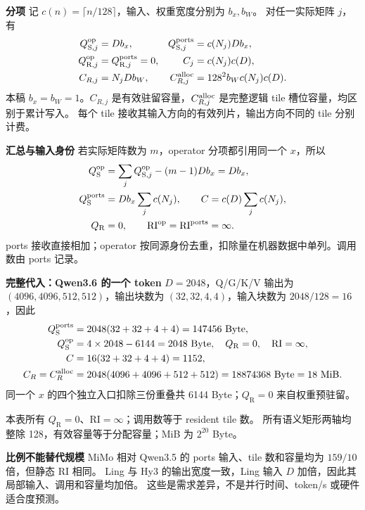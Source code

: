 \documentclass[11pt,a4paper,fontset=fandol]{ctexart}
\newcommand{\qs}{Q_{\mathrm S}}
\newcommand{\qr}{Q_{\mathrm R}}
\newcommand{\RI}{\mathrm{RI}}
\newcommand{\para}[1]{\par\smallskip\noindent\textbf{#1}\quad}
\begin{document}
\para{分项}
记 $c(n)=\lceil n/128\rceil$，输入、权重宽度分别为 $b_x,b_W$。
对任一实际矩阵 $j$，有
\begin{align}
Q_{\mathrm S,j}^{\rm op}&=Db_x,& Q_{\mathrm S,j}^{\rm ports}&=c(N_j)Db_x,\\
Q_{\mathrm R,j}^{\rm op}&=Q_{\mathrm R,j}^{\rm ports}=0,& C_j&=c(N_j)c(D),\\
C_{R,j}&=N_jDb_W,& C_{R,j}^{\rm alloc}&=128^2b_Wc(N_j)c(D).
\end{align}
本稿 $b_x=b_W=1$。$C_{R,j}$ 是有效驻留容量，$C_{R,j}^{\rm alloc}$ 是完整逻辑 tile 槽位容量，均区别于累计写入。
每个 tile 接收其输入方向的有效列片，输出方向不同的 tile 分别计费。

\para{汇总与输入身份}
若实际矩阵数为 $m$，operator 分项都引用同一个 $x$，所以
\begin{align}
\qs^{\rm op}&=\sum_jQ_{\mathrm S,j}^{\rm op}-(m-1)Db_x=Db_x,\\
\qs^{\rm ports}&=Db_x\sum_jc(N_j),\qquad
C=c(D)\sum_jc(N_j),\\
\qr&=0,\qquad \RI^{\rm op}=\RI^{\rm ports}=\infty.
\end{align}
ports 接收直接相加；operator 按同源身份去重，扣除量在机器数据中单列。调用数由 ports 记录。

\para{完整代入：Qwen3.6 的一个 token}
$D=2048$，Q/G/K/V 输出为 $(4096,4096,512,512)$，输出块数为 $(32,32,4,4)$，输入块数为 $2048/128=16$，因此
\begin{align*}
\qs^{\rm ports}&=2048(32+32+4+4)=147456\ \mathrm{Byte},\\
\qs^{\rm op}&=4\times2048-6144=2048\ \mathrm{Byte},\quad \qr=0,\quad \RI=\infty,\\
C&=16(32+32+4+4)=1152,\\
C_R=C_R^{\rm alloc}&=2048(4096+4096+512+512)=18874368\ \mathrm{Byte}=18\ \mathrm{MiB}.
\end{align*}
同一个 $x$ 的四个独立入口扣除三份重叠共 6144 Byte；$\qr=0$ 来自权重预驻留。

\begin{center}\small

\end{center}
\noindent 本表所有 $\qr=0$、$\RI=\infty$；调用数等于 resident tile 数。
所有语义矩形两轴均整除 128，有效容量等于分配容量；MiB 为 $2^{20}$ Byte。

\para{比例不能替代规模}
MiMo 相对 Qwen3.5 的 ports 输入、tile 数和容量均为 $159/10$ 倍，但静态 RI 相同。
Ling 与 Hy3 的输出宽度一致，Ling 输入 $D$ 加倍，因此其局部输入、调用和容量均加倍。
这些是需求差异，不是并行时间、token/s 或硬件适合度预测。
\end{document}
